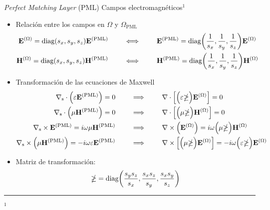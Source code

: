\begin{frame}{\textit{Perfect Matching Layer} (PML)}
{Campos electromagnéticos$^1$ \hyperlink{fr:Apoyo}{\beamerreturnbutton{}}}\small
\begin{itemize}
\item Relación entre los campos en $\Omega$ y $\Omega_\text{PML}$
\begin{align*}
        \vb{E}^{(\Omega)} = \text{diag}(s_x,s_y,s_z)\vb{E}^\text{(PML)}
            \qquad
            &\iff
            \qquad
         \vb{E}^\text{(PML)} = \text{diag}\qty(\frac{1}{s_x},\frac{1}{s_y},\frac{1}{s_z})\vb{E}^{(\Omega)}
    \\
       \vb{H}^{(\Omega)} = \text{diag}(s_x,s_y,s_z)\vb{H}^\text{(PML)}
            \qquad
             &\iff
            \qquad
       \vb{H}^\text{(PML)} = \text{diag}\qty(\frac{1}{s_x},\frac{1}{s_y},\frac{1}{s_z})\vb{H}^{(\Omega)}
   \end{align*}
%
\item Transformación de las ecuaciones de Maxwell
\begin{align*}
        \nabla_\text{s} \cdot \qty(\varepsilon \vb{E}^\text{(PML)})  = 0
            \qquad &\implies\qquad
            \nabla \cdot \Big[\Big(\varepsilon \mathbb{\Lambda}\Big)\vb{E}^{(\Omega)}\Big] =  0
             \\
        \nabla_\text{s}  \cdot    \Big(\mu \vb{H}^\text{(PML)}\Big) = 0
            \qquad &\implies\qquad
            \nabla \cdot \Big[\Big(\mu \mathbb{\Lambda} \Big)\vb{H}^{(\Omega)}\Big] =  0
            \\
        \nabla_\text{s} \times \vb{E}^\text{(PML)}  = i\omega \mu \vb{H}^\text{(PML)}
            \qquad &\implies\qquad
            \nabla \times \Big(\vb{E}^{(\Omega)}\Big) = i\omega\Big( \mu\mathbb{\Lambda}\Big) \vb{H}^{(\Omega)}
            \\
        \nabla_\text{s}  \times\Big(\mu \vb{H}^\text{(PML)} \Big) =   - i\omega \varepsilon \vb{E}^\text{(PML)}
            \qquad &\implies\qquad
            \nabla \times \Big[\Big(\mu \mathbb{\Lambda}\Big) \vb{E}^{(\Omega)}\Big] =  -i\omega\Big(\varepsilon\mathbb{\Lambda}\Big)\vb{E}^{(\Omega)}
    \end{align*}
\item Matriz de transformación:
        \begin{align*}
        \mathbb{\Lambda} = \text{diag}\qty(\frac{s_y s_z}{s_x},\frac{s_x s_z}{s_y},\frac{s_x s_y}{s_z})
    \end{align*}

\end{itemize}

	\noindent\rule{.25\textwidth}{0.4pt}
 \begin{spacing}{0}\fontsize{4}{12} \selectfont
	$^1$ 
	\end{spacing}
\end{frame}
